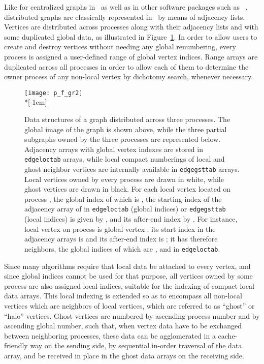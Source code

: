 \documentclass[fleqn,12pt,twoside]{article}
\newcommand{\lbt}{\linebreak[2]}
\begin{document}
Like for centralized graphs in \scotch\ as well as in other software
packages such as \metis~\cite{webmetis-parmetis}, distributed graphs
are classically represented in \ptscotch\ by means of adjacency
lists. Vertices are distributed across processes along with their
adjacency lists and with some duplicated global data, as illustrated
in Figure~\ref{fig-struct-graph}. In order to allow users to create
and destroy vertices without needing any global renumbering, every
process is assigned a user-defined range of global vertex
indices. Range arrays are duplicated across all processes in order to
allow each of them to determine the owner process of any non-local
vertex by dichotomy search, whenever necessary.

\begin{figure}
\texttt{[image: p\_f\_gr2]} \\*[-1em]
\caption{Data structures of a graph distributed across three
  processes. The global image of the graph is shown above, while the
  three partial subgraphs owned by the three processes are
  represented below.
  Adjacency arrays with global vertex indexes are stored in
  {\tt edge\protect\lbt loc\protect\lbt tab} arrays, while local
  compact numberings of local and ghost neighbor vertices are
  internally available in {\tt edge\protect\lbt gst\protect\lbt tab}
  arrays. Local vertices owned by every process are drawn in
  white, while ghost vertices are drawn in black. For each local
  vertex  located on process , the global index of which is
  , the starting index of the adjacency array
  of  in {\tt edge\protect\lbt loc\protect\lbt tab} (global
  indices) or {\tt edge\protect\lbt gst\protect\lbt tab} (local
  indices) is given by , and its after-end index by . For instance, local vertex  on
  process  is global vertex ; its start index in the
  adjacency arrays is  and its after-end index is ; it has
  therefore  neighbors, the global indices of which are , 
  and  in  {\tt edge\protect\lbt loc\protect\lbt tab}.}
\label{fig-struct-graph}
\end{figure}

Since many algorithms require that local data be attached to every
vertex, and since global indices cannot be used for that purpose, all
vertices owned by some process are also assigned local indices,
suitable for the indexing of compact local data arrays. This local
indexing is extended so as to encompass all non-local vertices which
are neighbors of local vertices, which are referred to as ``ghost'' or
``halo'' vertices. Ghost vertices are numbered by ascending process
number and by ascending global number, such that, when vertex data
have to be exchanged between neighboring processes, these data can be
agglomerated in a cache-friendly way on the sending side, by
sequential in-order traversal of the data array, and be
received in place in the ghost data arrays on the receiving side.
\end{document}
